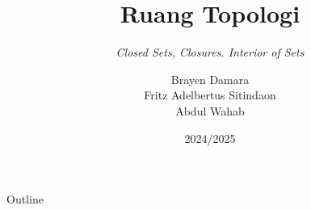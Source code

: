 \documentclass{beamer}
\title{Ruang Topologi}
\subtitle{\textit{Closed Sets, Closures. Interior of Sets}}
\date[]{2024/2025}
\author[Brayen, Fritz, Wahab]{Brayen Damara\\Fritz Adelbertus Sitindaon\\Abdul Wahab}
\begin{document}
\begin{frame}
\titlepage
\end{frame}

\begin{frame}{Outline}
    \tableofcontents
\end{frame}






\end{document}
